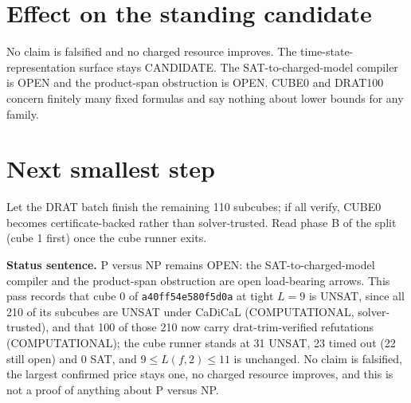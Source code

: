 \documentclass[11pt]{article}
\begin{document}
\section*{Effect on the standing candidate}
No claim is falsified and no charged resource improves. The time-state-representation surface stays CANDIDATE. The SAT-to-charged-model compiler is OPEN and the product-span obstruction is OPEN. CUBE0 and DRAT100 concern finitely many fixed formulas and say nothing about lower bounds for any family.

\section*{Next smallest step}
Let the DRAT batch finish the remaining 110 subcubes; if all verify, CUBE0 becomes certificate-backed rather than solver-trusted. Read phase B of the split (cube 1 first) once the cube runner exits.

\bigskip
\noindent\textbf{Status sentence.} P versus NP remains OPEN: the SAT-to-charged-model compiler and the product-span obstruction are open load-bearing arrows. This pass records that cube 0 of \texttt{a40ff54e580f5d0a} at tight $L=9$ is UNSAT, since all 210 of its subcubes are UNSAT under CaDiCaL (COMPUTATIONAL, solver-trusted), and that 100 of those 210 now carry drat-trim-verified refutations (COMPUTATIONAL); the cube runner stands at 31 UNSAT, 23 timed out (22 still open) and 0 SAT, and $9\le L(f,2)\le 11$ is unchanged. No claim is falsified, the largest confirmed price stays one, no charged resource improves, and this is not a proof of anything about P versus NP.
\end{document}
